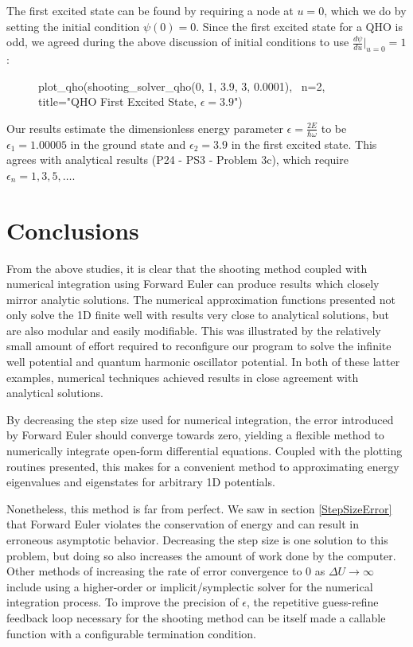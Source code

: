 \documentclass{article}
\begin{document}
The first excited state can be found by requiring a node at $u = 0$, which we
do by setting the initial condition $\psi(0)=0$. Since the first excited state 
for a QHO is odd, we agreed during the above discussion of initial conditions to
use $\frac{d\psi}{du}\big|_{u=0}=1$:

\begin{figure}[H]
\begin{sageblock}
plot_qho(shooting_solver_qho(0, 1, 3.9, 3, 0.0001), \
              n=2, title="QHO First Excited State, $\epsilon=3.9$")
\end{sageblock}
\vspace{-.1in}
\centering
{}
\end{figure}

Our results estimate the dimensionless energy parameter
$\epsilon=\frac{2E}{\hbar\omega}$ to be $\epsilon_1=1.00005$ in the ground
state and $\epsilon_2=3.9$ in the first excited state. This agrees with
analytical results (P24 - PS3 - Problem 3c), which require $\epsilon_n = 1, 3,
5, \ldots$. 

\section{Conclusions}

From the above studies, it is clear that the shooting method coupled with
numerical integration using Forward Euler can produce results which closely
mirror analytic solutions. The numerical approximation functions presented not
only solve the 1D finite well with results very close to analytical solutions,
but are also modular and easily modifiable. This was illustrated by the
relatively small amount of effort required to reconfigure our program to solve
the infinite well potential and quantum harmonic oscillator potential. In both
of these latter examples, numerical techniques achieved results in close
agreement with analytical solutions.

By decreasing the step size used for numerical integration, the error
introduced by Forward Euler should converge towards zero, yielding a flexible
method to numerically integrate open-form differential equations. Coupled with
the plotting routines presented, this makes for a convenient method to
approximating energy eigenvalues and eigenstates for arbitrary 1D potentials.

Nonetheless, this method is far from perfect. We saw in section
\ref{StepSizeError} that Forward Euler violates the conservation of energy and
can result in erroneous asymptotic behavior. Decreasing the step size is one
solution to this problem, but doing so also increases the amount of work done
by the computer. Other methods of increasing the rate of error convergence to 0
as $\Delta U \rightarrow \infty$ include using a higher-order or
implicit/symplectic solver for the numerical integration process. To improve
the precision of $\epsilon$, the repetitive guess-refine feedback loop
necessary for the shooting method can be itself made a callable function with a
configurable termination condition.
\end{document}
